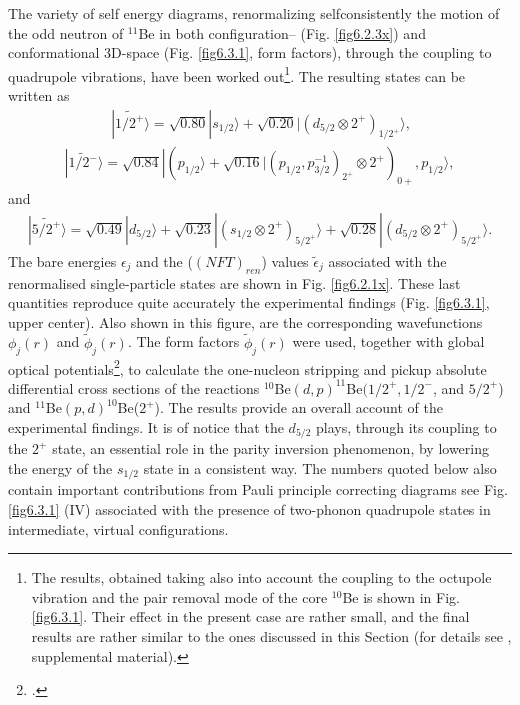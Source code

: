   
  The variety of self energy diagrams, renormalizing selfconsistently  
  the motion 
  of the odd neutron of $^{11}$Be in both configuration-- (Fig. \ref{fig6.2.3x}) 
  and conformational 3D-space (Fig. \ref{fig6.3.1}, form factors), through the coupling to quadrupole vibrations, have been worked out\footnote{The results, obtained taking also into account the coupling to the octupole vibration and the pair removal mode of the core $^{10}$Be is shown in Fig. \ref{fig6.3.1}. Their effect in the present case are rather small, and the final results are rather similar to the ones discussed in this Section (for details see \cite{Barranco:17}, supplemental material).}.
  The resulting states can be written as 
  \begin{align}\label{eq6.2.1}
  \ |\widetilde{1/2^+} \rangle  =  \sqrt{0.80} |s_{1/2}\rangle + \sqrt{0.20} |(d_{5/2}\otimes 2^+)_{1/2^+}\rangle,    
  \end{align}
  \begin{align}\label{eq6.2.2}
  |\widetilde{1/2^-}\rangle =  \sqrt{0.84} |(p_{1/2}\rangle + \sqrt{0.16} |(p_{1/2},p^{-1}_{3/2})_{2^+}
  \otimes 2^+)_{0+}, p_{1/2}\rangle, 
  \end{align}
  and
  \begin{align}\label{eq6.2.3}
  |\widetilde{5/2^+}\rangle  =\sqrt{0.49} |d_{5/2}\rangle+ \sqrt{0.23}|(s_{1/2}\otimes 2^+)_{5/2^+} \rangle  
  + \sqrt{0.28} |(d_{5/2}\otimes 2^+)_{5/2^+} \rangle. 
  \end{align}  
  The  bare energies $\epsilon_j$ and the ($(NFT)_{ren}$) values  $\tilde \epsilon_j$ 
  associated with the renormalised single-particle states 
  are shown in Fig. \ref{fig6.2.1x}. These last quantities reproduce quite accurately the experimental findings (Fig. \ref{fig6.3.1}, upper center). Also shown in this figure, are the corresponding wavefunctions $\phi_j(r)$ and $\tilde \phi_j(r)$.
  The  form factors $\tilde\phi_j(r)$  were used,  
  together with  global optical  potentials\footnote{\cite{Han:06,Koning:03}.}, to calculate the one-nucleon stripping and pickup absolute differential 
  cross sections of the reactions $^{10}$Be$(d,p)^{11}$Be$(1/2^+,1/2^-$, and $5/2^+$) and $^{11}$Be$(p,d)^{10}$Be($2^+$). The results provide an overall account  of the experimental findings. It is of notice that the $d_{5/2}$ plays, through its coupling to the $2^+$ state, an essential role in the parity inversion phenomenon, by lowering the energy of the $s_{1/2}$ state in a consistent way. The numbers quoted below also contain important contributions from Pauli principle correcting diagrams see Fig. \ref{fig6.3.1} (IV) associated with the presence of two-phonon quadrupole states in intermediate, virtual configurations.
  
